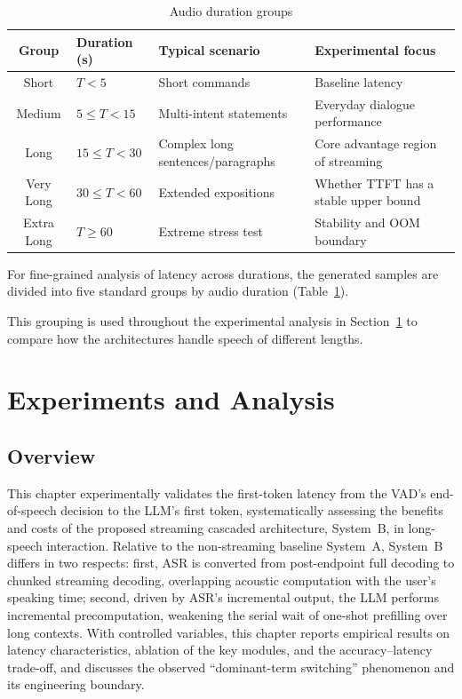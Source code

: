 \documentclass[a4paper,11pt]{article}
\begin{document}
\begin{table}[htbp]
\centering
\caption{Audio duration groups}
\label{tab:groups}
\begin{tabular}{clll}
\toprule
Group & Duration (s) & Typical scenario & Experimental focus \\
\midrule
Short & $T<5$ & Short commands & Baseline latency \\
Medium & $5\leq T<15$ & Multi-intent statements & Everyday dialogue performance \\
Long & $15\leq T<30$ & Complex long sentences/paragraphs & Core advantage region of streaming \\
Very Long & $30\leq T<60$ & Extended expositions & Whether TTFT has a stable upper bound \\
Extra Long & $T\geq60$ & Extreme stress test & Stability and OOM boundary \\
\bottomrule
\end{tabular}
\end{table}

For fine-grained analysis of latency across durations, the generated samples are divided into five standard groups by audio duration (Table~\ref{tab:groups}).

This grouping is used throughout the experimental analysis in Section~\ref{sec:experiments} to compare how the architectures handle speech of different lengths.

\section{Experiments and Analysis}
\label{sec:experiments}

\subsection{Overview}

This chapter experimentally validates the first-token latency from the VAD's end-of-speech decision to the LLM's first token, systematically assessing the benefits and costs of the proposed streaming cascaded architecture, System~B, in long-speech interaction. Relative to the non-streaming baseline System~A, System~B differs in two respects: first, ASR is converted from post-endpoint full decoding to chunked streaming decoding, overlapping acoustic computation with the user's speaking time; second, driven by ASR's incremental output, the LLM performs incremental precomputation, weakening the serial wait of one-shot prefilling over long contexts. With controlled variables, this chapter reports empirical results on latency characteristics, ablation of the key modules, and the accuracy--latency trade-off, and discusses the observed ``dominant-term switching'' phenomenon and its engineering boundary.
\end{document}
